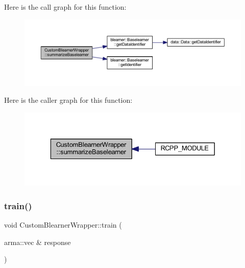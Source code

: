 Here is the call graph for this function\+:\nopagebreak
\begin{figure}[H]
\begin{center}
\leavevmode
\includegraphics[width=350pt]{class_custom_blearner_wrapper_a61e82d619f07ba3e69fa4100be0ed1f2_cgraph}
\end{center}
\end{figure}
Here is the caller graph for this function\+:\nopagebreak
\begin{figure}[H]
\begin{center}
\leavevmode
\includegraphics[width=329pt]{class_custom_blearner_wrapper_a61e82d619f07ba3e69fa4100be0ed1f2_icgraph}
\end{center}
\end{figure}
\mbox{\label{class_custom_blearner_wrapper_a970f89e16f5dc5cfce1e1dc4461d34a5}} 
\subsubsection{\texorpdfstring{train()}{train()}}
{\footnotesize\ttfamily void Custom\+Blearner\+Wrapper\+::train (\begin{DoxyParamCaption}\item[{arma\+::vec \&}]{response }\end{DoxyParamCaption})\hspace{0.3cm}{\ttfamily [inline]}}


